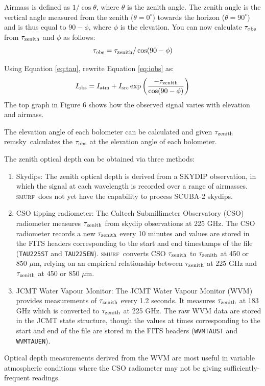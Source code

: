 \documentclass[twoside,11pt]{article}
\newcommand{\xref}[3]{#1}
\renewcommand{\_}{\texttt{\symbol{95}}}
\newcommand{\SMURF}{\textsc{smurf}}
\newcommand{\task}[1]{\textsf{#1}}
\newcommand{\remsky}{\xref{\task{remsky}}{sun258}{REMSKY}}
\begin{document}
Airmass is defined as $1 / \cos \theta$, where $\theta$ is the zenith
angle. The zenith angle is the vertical angle measured from the zenith
($\theta = 0^\circ$) towards the horizon ($\theta = 90^\circ$) and is
thus equal to $90-\phi$, where $\phi$ is the elevation. You can now
calculate $\tau_{\rm obs}$ from $\tau_{\rm zenith}$ and $\phi$ as
follows:
\begin{equation}
\tau_{\rm obs} = \tau_{\rm zenith} / \cos(90 - \phi )
\label{eq:tau}
\end{equation}


Using Equation \ref{eq:tau}, rewrite Equation \ref{eq:iobs} as:
\begin{equation}
I_{\rm obs} = I_{\rm atm} + I_{\rm src} \exp \left( 
\frac{-\tau_{\rm zenith}}{\cos(90-\phi)}\right)
\end{equation}
The top graph in Figure 6 shows how the observed signal varies with elevation
and airmass.

The elevation angle of each bolometer can be calculated and given
$\tau_{\rm zenith}$ \remsky\ calculates the $\tau_{\rm obs}$ at the
elevation angle of each bolometer. 

The zenith optical depth can be obtained via three methods:
\begin{enumerate}
\item Skydips: The zenith optical depth is derived from a SKYDIP
  observation, in which the signal at each wavelength is recorded over
  a range of airmasses. \SMURF\ does not yet have the capability to
  process SCUBA-2 skydips.

\item CSO tipping radiometer: The Caltech Submillimeter Observatory
  (CSO) radiometer measures $\tau_{\rm zenith}$ from skydip
  observations at 225 GHz. The CSO radiometer records a new $\tau_{\rm
    zenith}$ every 10 minutes and values are stored in the FITS
  headers corresponding to the start and end timestamps of the file
  (\texttt{TAU225ST} and \texttt{TAU225EN}). \SMURF\ converts CSO
  $\tau_{\rm zenith}$ to $\tau_{\rm zenith}$ at 450 or 850 $\mu$m,
  relying on an empirical relationship between $\tau_{\rm zenith}$ at
  225 GHz and $\tau_{\rm zenith}$ at 450 or 850 $\mu$m.

\item JCMT Water Vapour Monitor: The JCMT Water Vapour Monitor (WVM)
  provides measurements of $\tau_{\rm zenith}$ every 1.2 seconds. It
  measures $\tau_{\rm zenith}$ at 183 GHz which is converted to
  $\tau_{\rm zenith}$ at 225 GHz. The raw WVM data are stored in the
  JCMT state structure, though the values at times corresponding to
  the start and end of the file are stored in the FITS headers
  (\texttt{WVMTAUST} and \texttt{WVMTAUEN}).
\end{enumerate}
Optical depth measurements derived from the WVM are most useful in
variable atmospheric conditions where the CSO radiometer may not be
giving sufficiently-frequent readings.
\end{document}
